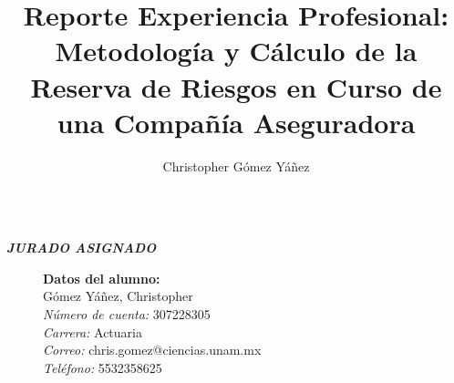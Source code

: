\documentclass[11pt,twoside,openright,spanish]{report}
\numberwithin{equation}{chapter}
\numberwithin{figure}{chapter}
\numberwithin{table}{chapter}
\renewcommand{\baselinestretch}{1.5}
\newenvironment{changemargin}[3]{
	\begin{list}{}{
			\setlength{\topsep}{#3}
			\setlength{\leftmargin}{#1}
			\setlength{\rightmargin}{#2}
			\setlength{\listparindent}{\parindent}
			\setlength{\itemindent}{\parindent}
			\setlength{\parsep}{\parskip}
		}
		\item[]}{\end{list}}
\begin{document}
	
	\renewcommand{\baselinestretch}{1}
	
	\graphicspath{{./Imagenes/}}
	
	\title{Reporte Experiencia Profesional: Metodología y Cálculo de la Reserva de Riesgos en Curso de una Compañía Aseguradora}
	\author{Christopher Gómez Yáñez}
	\maketitle
	
	\newpage
	$\ $
	\thispagestyle{empty} %
	
	\begin{changemargin}{1cm}{0cm}{1cm}
		
		\vspace{30cm} 
		\begin{center}
			\textit{\textbf{\Large JURADO ASIGNADO}}
		\end{center}
		\vspace{1cm}
		 
		\begin{description}
			\item[]\textbf{Datos del alumno:}\\
			Gómez Yáñez, Christopher\\
			\textit{Número de cuenta:} 307228305\\
			\textit{Carrera:} Actuaria\\
			\textit{Correo:} chris.gomez@ciencias.unam.mx\\
			\textit{Teléfono:} 5532358625
			

\end{description}
\end{changemargin}
\end{document}
